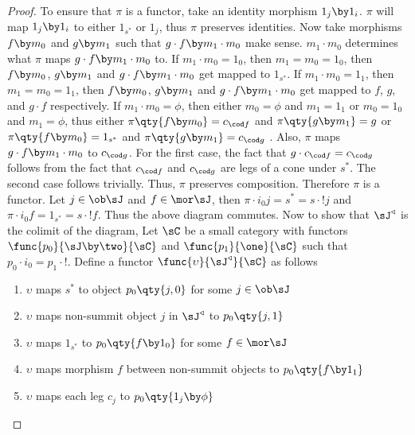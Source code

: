 \documentclass[../../main]{subfiles}
\begin{document}
\begin{proof}
	To ensure that $\pi$ is a functor, take an identity morphism
	$1_{j}\by1_{i}$. $\pi$ will map $1_{j}\by1_{i}$ to either $1_{s^{*}}$ or
	$1_{j}$, thus $\pi$ preserves identities. Now take morphisms $f\by m_{0}$
	and $g\by m_{1}$ such that $g\cdot f \by m_{1}\cdot m_{0}$ make sense.
	$m_{1}\cdot m_{0}$ determines what $\pi$ maps $g\cdot f \by m_{1}\cdot
	m_{0}$ to. If $m_{1}\cdot m_{0} = 1_{0}$, then $m_{1} = m_{0} = 1_{0}$, then
	$f\by m_{0}$, $g\by m_{1}$ and $g\cdot f \by m_{1}\cdot m_{0}$ get mapped to
	$1_{s^{*}}$. If $m_{1}\cdot m_{0} = 1_{1}$, then $m_{1} = m_{0} = 1_{1}$,
	then $f\by m_{0}$, $g\by m_{1}$ and $g\cdot f \by m_{1}\cdot m_{0}$ get
	mapped to $f$, $g$, and $g\cdot f$ respectively. If  $m_{1}\cdot m_{0} =
	\phi$, then either $m_{0} = \phi$ and $m_{1} = 1_{1}$ or $m_{0} = 1_{0}$ and
	$m_{1} = \phi$, thus either $\pi\qty{ f\by m_{0} }= c_{\cod f}$ and
	$\pi\qty{ g\by m_{1} }= g$ or $\pi\qty{ f\by m_{0} }= 1_{s^{*}}$ and
	$\pi\qty{ g \by m_{1} }=  c_{\cod g}$  . Also, $\pi$ maps $g\cdot f \by
	m_{1}\cdot m_{0}$ to $c_{\cod g}$. For the first case, the fact that $g
	\cdot c_{\cod f} = c_{\cod g}$ follows from the fact that $c_{\cod f}$ and
	$c_{\cod g}$ are legs of a cone under $s^{*}$. The second case follows
	trivially. Thus, $\pi$ preserves composition. Therefore $\pi$ is a functor.
	Let $j \in \ob \sJ$ and $f \in \mor \sJ$, then $\pi \cdot i_{0}j  = s^{*} =
	s \cdot !j$ and $\pi \cdot i_{0}f  = 1_{s^{*}} = s \cdot !f$. Thus the above
	diagram commutes. Now to show that $\sJ^{\triangleleft}$ is the colimit of
	the diagram, Let $\sC$ be a small category with functors $\func{p_{0}}{\sJ
	\by \two}{\sC}$ and $\func{p_{1}}{\one}{\sC}$ such that $p_{0} \cdot i_{0} =
	p_{1} \cdot !  $. Define a functor
	$\func{\upsilon}{\sJ^{\triangleleft}}{\sC}$ as follows

	\begin{enumerate}
		\item $\upsilon$ maps $s^{*}$ to  object $p_{0}\qty{j,0}$ for some $j \in \ob \sJ$
		\item $\upsilon$ maps non-summit object $j$ in $\sJ^{\triangleleft}$ to $p_{0}\qty{j,1}$
		\item $\upsilon$ maps $1_{s^{*}}$ to  $p_{0}\qty{f\by1_{0}}$ for some $f \in \mor \sJ$
		\item $\upsilon$ maps morphism $f$ between non-summit objects to  $p_{0}\qty{f\by1_{1}}$
		\item $\upsilon$ maps each leg $c_{j}$ to $p_{0}\qty{1_{j}\by\phi}$
	\end{enumerate}


\end{proof}
\end{document}
